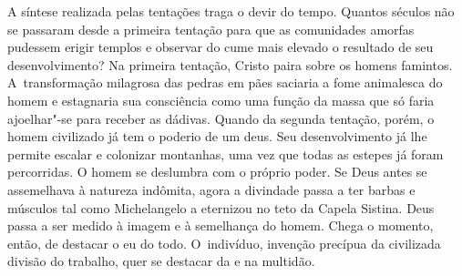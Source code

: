 A síntese realizada pelas tentações traga o devir do tempo. Quantos
séculos não se passaram desde a primeira tentação para que as
comunidades amorfas pudessem erigir templos e observar do cume mais
elevado o resultado de seu desenvolvimento? Na primeira tentação, Cristo
paira sobre os homens famintos. A~transformação milagrosa das pedras em
pães saciaria a fome animalesca do homem e estagnaria sua consciência
como uma função da massa que só faria ajoelhar"-se para receber as
dádivas. Quando da segunda tentação, porém, o homem civilizado já tem o
poderio de um deus. Seu desenvolvimento já lhe permite escalar e
colonizar montanhas, uma vez que todas as estepes já foram percorridas.
O homem se deslumbra com o próprio poder. Se Deus antes se assemelhava à
natureza indômita, agora a divindade passa a ter barbas e músculos tal
como Michelangelo a eternizou no teto da Capela Sistina. Deus passa a
ser medido à imagem e à semelhança do homem. Chega o momento, então, de
destacar o eu do todo. O~indivíduo, invenção precípua da civilizada
divisão do trabalho, quer se destacar da e na multidão.

